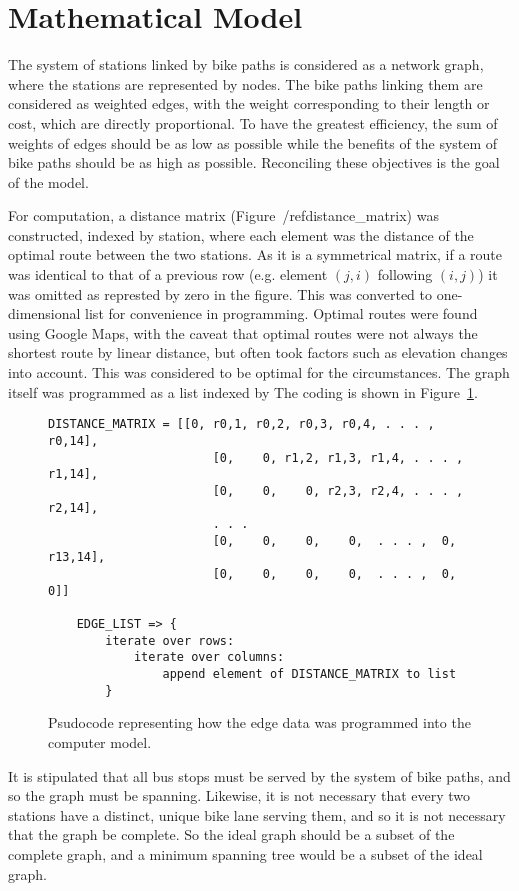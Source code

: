 \usepackage{fancyvrb}



\section{Mathematical Model} 

The system of stations linked by bike paths is considered as a network graph, where the stations are represented by nodes.  The bike paths linking them are considered as weighted edges, with the weight corresponding to their length or cost, which are directly proportional.  To have the greatest efficiency, the sum of weights of edges should be as low as possible while the benefits of the system of bike paths should be as high as possible.  Reconciling these objectives is the goal of the model.

For computation, a distance matrix (Figure~/ref{distance_matrix}) was constructed, indexed by station, where each element was the distance of the optimal route between the two stations.  As it is a symmetrical matrix, if a route was identical to that of a previous row (e.g. element $(j, i)$ following $(i, j)$) it was omitted as represted by zero in the figure.  This was converted to one-dimensional list for convenience in programming.  Optimal routes were found using Google Maps, with the caveat that optimal routes were not always the shortest route by linear distance, but often took factors such as elevation changes into account.  This was considered to be optimal for the circumstances.  The graph itself was programmed as a list indexed by The coding is shown in Figure~\ref{code1}.

\begin{figure}[!hbp]
	\begin{Verbatim}[frame=single] 
	DISTANCE_MATRIX = [[0, r0,1, r0,2, r0,3, r0,4, . . . , r0,14], 
					   [0,    0, r1,2, r1,3, r1,4, . . . , r1,14], 
					   [0,    0,    0, r2,3, r2,4, . . . , r2,14], 
					   . . . 
					   [0,    0,    0,    0,  . . . ,  0, r13,14], 
					   [0,    0,    0,    0,  . . . ,  0,      0]]
					   
	EDGE_LIST => {
		iterate over rows: 
			iterate over columns: 
				append element of DISTANCE_MATRIX to list
		}
	\end{Verbatim} 
	\caption[Programming edge data]{Psudocode representing how the edge data was programmed into the computer model.}
	\label{code1} 
	\end{figure} 	

It is stipulated that all bus stops must be served by the system of bike paths, and so the graph must be spanning.  Likewise, it is not necessary that every two stations have a distinct, unique bike lane serving them, and so it is not necessary that the graph be complete.  So the ideal graph should be a subset of the complete graph, and a minimum spanning tree would be a subset of the ideal graph.
